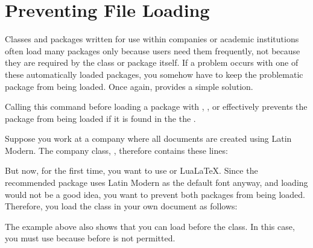 \section{Preventing File Loading}

Classes and packages written for use
within companies or academic institutions often load many packages only
because users need them frequently, not because they are required by the class
or package itself. If a problem occurs with one of these automatically loaded
packages, you somehow have to keep the problematic package from being loaded.
Once again,  provides a simple solution.

\begin{Declaration}
\end{Declaration}
Calling this command before loading a
package with ,
, or
effectively prevents the package from being loaded if it is found in the the
.
%
\begin{Example}
  Suppose you work at a company where all documents are created using Latin
  Modern. The company class, , therefore contains these lines:
\begin{lstcode}
  \RequirePackage[T1]{fontenc}
  \RequirePackage{lmodern}
\end{lstcode}
  But now, for the first time, you want to use \XeLaTeX{} or Lua\LaTeX{}.
  Since the recommended  package uses Latin Modern as the
  default font anyway, and loading  would not be a good idea,
  you want to prevent both packages from being loaded. Therefore, you load the
  class in your own document as follows:
\end{Example}
The example above also shows that you can load  before the
class. In this case, you must use
 because 
before  is not permitted.

